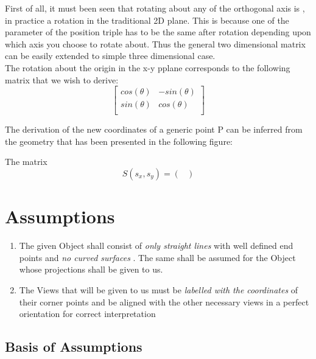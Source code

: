 \documentclass[12pt]{report}
\begin{document}
First of all, it must been seen that rotating about any of the orthogonal axis is , in practice a rotation in the traditional 2D plane. This is because one of the parameter of the position triple has to be the same after rotation depending upon which axis you choose to rotate about. Thus the general two dimensional matrix can be easily extended to simple three dimensional case.
\vspace{0.3cm}
\\The rotation about the origin in the x-y pplane corresponds to the following matrix that we wish to derive:
\[ \begin{bmatrix}
cos(\theta)  &  -sin(\theta) \\
sin(\theta)  &  cos(\theta) \\
\end{bmatrix}\]

\hspace{1cm} The derivation of the new coordinates of a generic point P can be inferred from the geometry that has been presented in the following figure:
\\
\vspace{0.2cm}

The matrix
\[ S(s_{x},s_{y}) = \begin{pmatrix}
  
\end{pmatrix}  \]


\chapter{Assumptions}

\begin{enumerate}
    \item 
  The given Object shall consist of \textit{ only straight lines } with well defined end points and \textit{ no curved surfaces } . The same shall be assumed for the Object whose projections shall be given to us.
    \item 
  The Views that will be given to us must be \textit{ labelled with the coordinates } of their corner points and be aligned with the other necessary views in a perfect orientation for correct interpretation
\end{enumerate}

\section*{Basis of Assumptions}
\end{document}
